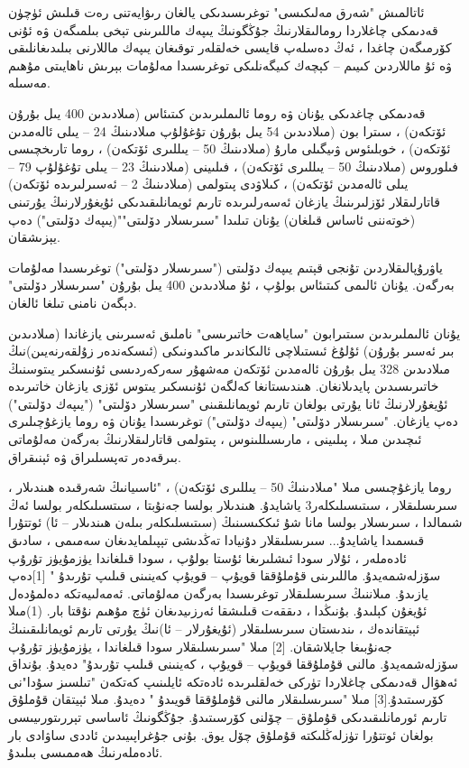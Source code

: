 \documentclass[a4paper]{article}
\begin{document}
ئاتالمىش "شەرق مەلىكىسى" توغرىسىدىكى يالغان رىۋايەتنى رەت قىلىش ئۈچۈن قەدىمكى چاغلاردا رومالىقلارنىڭ جۇڭگونىڭ يىپەك ماللىرىنى تېخى بىلمىگەن ۋە ئۇنى كۆرمىگەن چاغدا ، ئەڭ دەسلەپ قايسى خەلقلەر توقىغان يىپەك ماللارنى بىلىدىغانلىقى ۋە ئۇ ماللاردىن كىيىم – كېچەك كىيگەنلىكى توغرىسىدا مەلۇمات بېرىش ناھايىتى مۇھىم مەسىلە.



قەدىمكى چاغدىكى يۇنان ۋە روما ئالىملىرىدىن كىتىئاس (مىلادىدىن 400 يىل بۇرۇن ئۆتكەن) ، سىترا بون (مىلادىدىن 54 يىل بۇرۇن تۇغۇلۇپ مىلادىنىڭ 24 – يىلى ئالەمدىن ئۆتكەن) ، خوبلىئوس ۋىيگىلى مارۇ (مىلادىنىڭ 50 – يىللىرى ئۆتكەن) ، روما تارىخچىسى فىلوروس (مىلادىنىڭ 50 – يىللىرى ئۆتكەن) ، فىلىينى (مىلادىنىڭ 23 – يىلى تۇغۇلۇپ 79 – يىلى ئالەمدىن ئۆتكەن) ، كىلاۋدى پىتولمى (مىلادىنىڭ 2 – ئەسىرلىرىدە ئۆتكەن) قاتارلىقلار ئۆزلىرىنىڭ يازغان ئەسەرلىرىدە تارىم ئويمانلىقىدىكى ئۇيغۇرلارنىڭ يۇرتىنى (خوتەننى ئاساس قىلغان) يۇنان تىلىدا "سىرىسلار دۆلىتى""(يىپەك دۆلىتى") دەپ يېزىشقان.



ياۋرۇپالىقلاردىن تۇنجى قېتىم يىپەك دۆلىتى ("سىرىسلار دۆلىتى") توغرىسىدا مەلۇمات بەرگەن. يۇنان ئالىمى كىتىئاس بولۇپ ، ئۇ مىلادىدىن 400 يىل بۇرۇن "سىرىسلار دۆلىتى" دېگەن نامنى تىلغا ئالغان.



يۇنان ئالىملىرىدىن سىتىرابون "ساياھەت خاتىرىسى" ناملىق ئەسىرىنى يازغاندا (مىلادىدىن بىر ئەسىر بۇرۇن) ئۇلۇغ ئىستىلاچى ئالىكاندىر ماكىدونىكى (ئىسكەندەر زۇلقەرنەيىن)نىڭ مىلادىدىن 328 يىل بۇرۇن ئالەمدىن ئۆتكەن مەشھۇر سەركەردىسى ئۇنىسكىر يىتوسنىڭ خاتىرىسىدىن پايدىلانغان. ھىندىستانغا كەلگەن ئۇنىسكىر يىتوس ئۆزى يازغان خاتىرىدە ئۇيغۇرلارنىڭ ئانا يۇرتى بولغان تارىم ئويمانلىقىنى "سىرىسلار دۆلىتى" ("يىپەك دۆلىتى") دەپ يازغان. "سىرىسلار دۆلىتى" (يىپەك دۆلىتى") توغرىسىدا يۇنان ۋە روما يازغۇچىلىرى ئىچىدىن مىلا ، پىلىينى ، مارىسىللىنوس ، پىتولمى قاتارلىقلارنىڭ بەرگەن مەلۇماتى بىرقەدەر تەپسىلىراق ۋە ئېنىقراق.



روما يازغۇچىسى مىلا "مىلادىنىڭ 50 – يىللىرى ئۆتكەن) ، "ئاسىيانىڭ شەرقىدە ھىندىلار ، سىرىسلىقلار ، سىتىسىلىكلەر3 ياشايدۇ. ھىندىلار بولسا جەنۇبتا ، سىتسىلىكلەر بولسا ئەڭ شىمالدا ، سىرىسلار بولسا مانا شۇ ئىككىسىنىڭ (سىتىسلىكلەر بىلەن ھىندىلار – ئا) ئوتتۇرا قىسمىدا ياشايدۇ... سىرىسلىقلار دۇنيادا تەڭدىشى تېپىلمايدىغان سەمىمى ، سادىق ئادەملەر ، ئۇلار سودا ئىشلىرىغا ئۇستا بولۇپ ، سودا قىلغاندا يۈزمۇيۈز تۇرۇپ سۆزلەشمەيدۇ. ماللىرىنى قۇملۇققا قويۇپ – قويۇپ كەينىنى قىلىپ تۇرىدۇ " [1]دەپ يازىدۇ. مىلاننىڭ سىرىسلىقلار توغرىسىدا بەرگەن مەلۇماتى. ئەمەلىيەتكە دەلمۇدەل ئۇيغۇن كېلىدۇ. بۇنىڭدا ، دىققەت قىلىشقا ئەرزىيدىغان ئۈچ مۇھىم نۇقتا بار. (1)مىلا ئېيتقاندەك ، ىندىستان سىرىسلىقلار (ئۇيغۇرلار – ئا)نىڭ يۇرتى تارىم ئويمانلىقىنىڭ جەنۇبىغا جايلاشقان. [2] مىلا "سىرىسلىقلار سودا قىلغاندا ، يۈزمۇيۈز تۇرۇپ سۆزلەشمەيدۇ. مالنى قۇملۇققا قويۇپ – قويۇپ ، كەينىنى قىلىپ تۇرىدۇ" دەيدۇ. بۇنداق ئەھۋال قەدىمكى چاغلاردا تۈركى خەلقلىرىدە ئادەتكە ئايلىنىپ كەتكەن "تىلسىز سۇدا"نى كۆرسىتىدۇ.[3] مىلا "سىرىسلىقلار مالنى قۇملۇققا قويىدۇ " دەيدۇ. مىلا ئېيتقان قۇملۇق تارىم ئورمانلىقىدىكى قۇملۇق – چۆلنى كۆرسىتىدۇ. جۇڭگونىڭ ئاساسى تېررىتورىيىسى بولغان ئوتتۇرا تۈزلەڭلىكتە قۇملۇق چۆل يوق. بۇنى جۇغراپىيىدىن ئاددى ساۋادى بار ئادەملەرنىڭ ھەممىسى بىلىدۇ.
\end{document}
